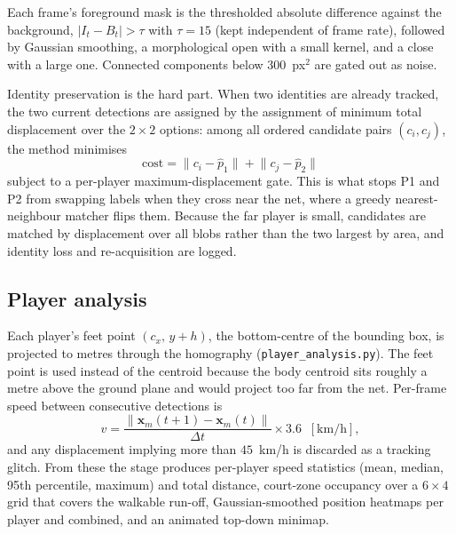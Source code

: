 \documentclass[11pt]{article}
\begin{document}
Each frame's foreground mask is the thresholded absolute difference against the background, $|I_t - B_t| > \tau$ with $\tau = 15$ (kept independent of frame rate), followed by Gaussian smoothing, a morphological open with a small kernel, and a close with a large one. Connected components below $300$~px$^2$ are gated out as noise.

Identity preservation is the hard part. When two identities are already tracked, the two current detections are assigned by the assignment of minimum total displacement over the $2\times2$ options: among all ordered candidate pairs $(c_i, c_j)$, the method minimises
\begin{equation}
\text{cost} = \lVert c_i - \hat{p}_1 \rVert + \lVert c_j - \hat{p}_2 \rVert
\end{equation}
subject to a per-player maximum-displacement gate. This is what stops P1 and P2 from swapping labels when they cross near the net, where a greedy nearest-neighbour matcher flips them. Because the far player is small, candidates are matched by displacement over all blobs rather than the two largest by area, and identity loss and re-acquisition are logged.

\subsection{Player analysis}
Each player's feet point $(c_x,\, y+h)$, the bottom-centre of the bounding box, is projected to metres through the homography (\texttt{player\_analysis.py}). The feet point is used instead of the centroid because the body centroid sits roughly a metre above the ground plane and would project too far from the net. Per-frame speed between consecutive detections is
\begin{equation}
v = \frac{\lVert \mathbf{x}_m(t{+}1) - \mathbf{x}_m(t)\rVert}{\Delta t}\times 3.6 \;\;[\text{km/h}],
\end{equation}
and any displacement implying more than $45$~km/h is discarded as a tracking glitch. From these the stage produces per-player speed statistics (mean, median, 95th percentile, maximum) and total distance, court-zone occupancy over a $6\times4$ grid that covers the walkable run-off, Gaussian-smoothed position heatmaps per player and combined, and an animated top-down minimap.
\end{document}
